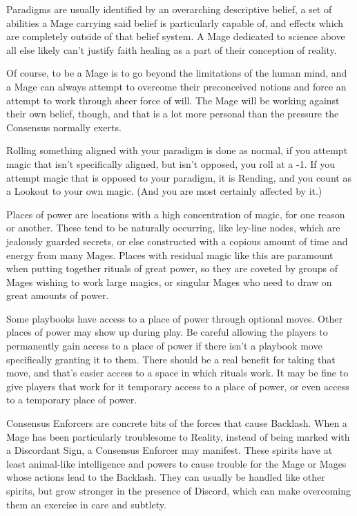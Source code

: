 \documentclass[letterpaper,12pt]{article}
\newcommand{\SECTION}[1]{\vspace{.5em}{\noindent\titlefont\large\textbf{#1}}

}
\begin{document}
Paradigms are usually identified by an overarching descriptive belief,
a set of abilities a Mage carrying said belief is particularly capable
of, and effects which are completely outside of that belief system. A
Mage dedicated to science above all else likely can't justify faith
healing as a part of their conception of reality.

Of course, to be a Mage is to go beyond the limitations of the human
mind, and a Mage can always attempt to overcome their preconceived
notions and force an attempt to work through sheer force of will. The
Mage will be working against their own belief, though, and that is a
lot more personal than the pressure the Consensus normally exerts.

Rolling something aligned with your paradigm is done as normal, if you
attempt magic that isn't specifically aligned, but isn't opposed, you
roll at a -1. If you attempt magic that is opposed to your paradigm,
it is Rending, and you count as a Lookout to your own magic. (And you
are most certainly affected by it.)

\SECTION{Place of Power}
Places of power are locations with a high concentration of magic, for
one reason or another. These tend to be naturally occurring, like
ley-line nodes, which are jealously guarded secrets, or else
constructed with a copious amount of time and energy from many
Mages. Places with residual magic like this are paramount when putting
together rituals of great power, so they are coveted by groups of
Mages wishing to work large magics, or singular Mages who need to draw
on great amounts of power.

Some playbooks have access to a place of power through optional
moves. Other places of power may show up during play. Be careful
allowing the players to permanently gain access to a place of power if
there isn't a playbook move specifically granting it to them. There
should be a real benefit for taking that move, and that's easier
access to a space in which rituals work. It may be fine to give
players that work for it temporary access to a place of power, or even
access to a temporary place of power.

\SECTION{Consensus Enforcer}
Consensus Enforcers are concrete bits of the forces that cause
Backlash. When a Mage has been particularly troublesome to Reality,
instead of being marked with a Discordant Sign, a Consensus Enforcer
may manifest. These spirits have at least animal-like intelligence and
powers to cause trouble for the Mage or Mages whose actions lead to
the Backlash. They can usually be handled like other spirits, but grow
stronger in the presence of Discord, which can make overcoming them an
exercise in care and subtlety.
\end{document}
